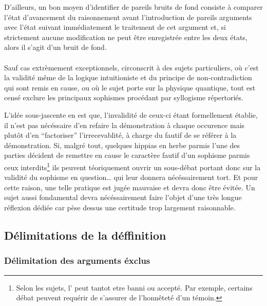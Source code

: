 D’ailleurs, un bon moyen d’identifier de pareils bruits de fond consiste à comparer l’état d’avancement du raisonnement avant l’introduction de pareils arguments avec l’état suivant immédiatement le traitement de cet argument et, si strictement aucune modification ne peut être enregistrée entre les deux états, alors il s’agit d’un bruit de fond.

\paragraph{}
Sauf cas extrèmement exceptionnels, circonscrit à des sujets particuliers, où c’est la validité même de la logique intuitioniste et du principe de non-contradiction qui sont remis en cause, ou où le sujet porte sur la physique quantique, tout \mainabbr{} est censé exclure les principaux sophismes procédant par syllogisme répertoriés.


L’idée sous-jascente en est que, l’invalidité de ceux-ci étant formellement établie, il n’est pas nécéssaire d’en refaire la démonstration à chaque occurence mais plutôt d’en \enquote{factoriser} l’irrecevablité, à charge du fautif de se référer à la démonstration. Si, malgré tout, quelques hippias en herbe parmis l’une des parties décident de remettre en cause le caractère fautif d’un sophisme parmis ceux interdits\footnote{Selon les sujets, l’ peut tantot etre banni ou accepté. Par exemple, certains débat peuvent requérir de s’assurer de l’honnêteté d’un témoin.} ils peuvent téoriquement ouvrir un sous-débat portant donc sur la validité du sophisme en question… qui leur donnera nécéssairement tort. Et pour cette raison, une telle pratique est jugée mauvaise et devra donc être évitée. Un sujet aussi fondamental devra nécéssairement faire l’objet d’une très longue réflexion dédiée car pèse dessus une certitude trop largement raisonnable.

\subsection{Délimitations de la déffinition}
\subsubsection{Délimitation des arguments éxclus}
